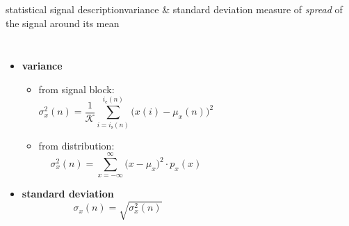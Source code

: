         \begin{frame}{statistical signal description}{variance \& standard deviation}
            \vspace{-2mm}
			measure of \textit{spread} of the signal around its mean
            \vspace{-5mm}
            \begin{columns}
            \begin{itemize}
                \item \textbf{variance}
                    \begin{itemize}
                        \item   from signal block:
                        \vspace{-2mm}
                            \begin{equation*}
                                \sigma_x^2(n) = \frac{1}{\mathcal{K}}\sum\limits_{i= i_{\mathrm{s}}(n)}^{i_{\mathrm{e}}(n)}{\big(x(i)-\mu_x(n)\big)^2} 
                            \end{equation*}
                        \pause
                        \item   from distribution:
                        \vspace{-2mm}
                            \begin{equation*}
                                \sigma_x^2(n) = \sum\limits_{x=-\infty}^{\infty}{\big(x-\mu_x\big)^2\cdot p_x(x)} 
                            \end{equation*}
                    \end{itemize}
                \pause
                \item \textbf{standard deviation}
                        \vspace{-2mm}
                    \begin{equation*}
                        \sigma_x(n) = \sqrt{\sigma_x^2(n)} 
                    \end{equation*}
            \end{itemize}
                
            \end{columns}
        \end{frame}

